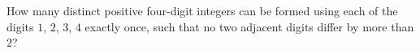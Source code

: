 How many distinct positive four-digit integers can be formed using each of the digits $1$, $2$, $3$, $4$ exactly once, such that no two adjacent digits differ by more than $2$?
